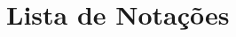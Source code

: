 \documentclass[12pt,oneside]{book} %
\begin{document}
\tableofcontents %
\thispagestyle{empty}

\listoffigures %
\thispagestyle{empty}
%










\chapter*{Lista de Notações}
\thispagestyle{empty}
\end{document}
